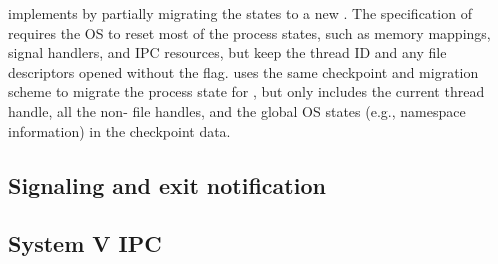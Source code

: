\thelibos{} implements  by partially migrating the \libos{} states
to a new \picoproc{}.
The specification of  requires the OS to reset
most of the process states, such as memory mappings, signal handlers, and IPC resources,
but keep the thread ID and any file descriptors
opened without the  flag.
\thelibos{} uses the same checkpoint and migration scheme
to migrate the process state for ,
but only includes the current thread handle, all the non- file handles, and the global OS states (e.g., namespace information) in the checkpoint data.


\subsection{Signaling and exit notification}




\subsection{System V IPC}


